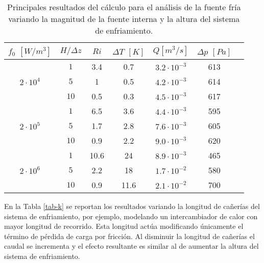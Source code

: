 \begin{table}[h!]
  \centering
  \begin{tabular}{ c c c c c c c } 
      \hline
      \multicolumn{1}{c}{$f_0$ $[W/m^3]$} & \multicolumn{1}{c}{$H / \Delta z$} & \multicolumn{1}{c}{$Ri$} & \multicolumn{1}{c}{$\Delta T$ $[K]$} & \multicolumn{1}{c}{$Q$$[m^3/s]$}& \multicolumn{1}{c}{$\Delta p$ $[Pa]$} \\ \hline
      \multirow{3}{*}{$2\cdot10^4$} & $1$ & 3.4 & 0.7 & $3.2 \cdot 10^{-3}$ & 613 \\
                         & $5$ & 1 & 0.5 & $4.2 \cdot 10^{-3}$ & 614 \\
                         & $10$ & 0.5 & 0.3 & $4.5 \cdot 10^{-3}$ & 617 \\ \hline
      \multirow{3}{*}{$2\cdot10^5$} & $1$ & 6.5 & 3.6 & $4.4 \cdot 10^{-3}$ & 595 \\
                         & $5$ & 1.7 & 2.8 & $7.6 \cdot 10^{-3}$ & 605 \\
                         & $10$ & 0.9 & 2.2 & $9.0 \cdot 10^{-3}$ & 620 \\ \hline
      \multirow{3}{*}{$2\cdot10^6$} & $1$ & 10.6 & 24 & $8.9 \cdot 10^{-3}$ & 465 \\
                         & $5$ & 2.2 & 18 & $1.7 \cdot 10^{-2}$ & 580 \\
                         & $10$ & 0.9 & 11.6 & $2.1 \cdot 10^{-2}$ & 700 \\ \hline
   \end{tabular}   
   \caption[Principales resultados del cálculo para el análisis de la fuente fría variando la magnitud de la fuente interna y la altura del sistema de enfriamiento]
   {Principales resultados del cálculo para el análisis de la fuente fría variando la magnitud de la fuente interna y la altura del sistema de enfriamiento.}
   \label{tab-deuterio}
\end{table}

En la Tabla \ref{tab-k} se reportan los resultados variando la longitud de cañerías del sistema de enfriamiento,
por ejemplo, modelando un intercambiador de calor con mayor longitud de recorrido.
Esta longitud actúa modificando únicamente el término de pérdida de carga por fricción.
Al disminuir la longitud de cañerías el caudal se incrementa y el efecto resultante es similar al de aumentar la altura del sistema de enfriamiento.

